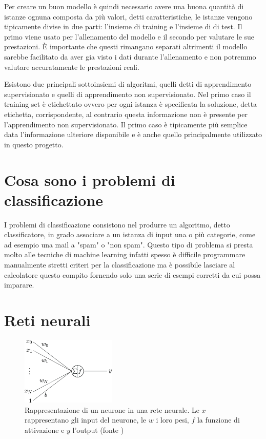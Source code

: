 \documentclass[a4paper,12pt]{report}
\begin{document}
Per creare un buon modello è quindi necessario avere una buona quantità di
istanze ognuna composta da più valori, detti caratteristiche, le istanze vengono
tipicamente divise in due parti: l'insieme di training e l'insieme di di test.
Il primo viene usato per l'allenamento del modello e il secondo per valutare le
sue prestazioni. È importante che questi rimangano separati altrimenti il
modello sarebbe facilitato da aver gia visto i dati durante l'allenamento e non
potremmo valutare accuratamente le prestazioni reali. 

Esistono due principali sottoinsiemi di algoritmi, quelli detti di apprendimento
supervisionato e quelli di apprendimento non supervisionato. Nel primo caso il
training set è etichettato ovvero per ogni istanza è specificata la soluzione,
detta etichetta, corrispondente, al contrario questa informazione non è presente
per l'apprendimento non supervisionato. Il primo caso è tipicamente più semplice
data l'informazione ulteriore disponibile e è anche quello principalmente
utilizzato in questo progetto.

\section{Cosa sono i problemi di classificazione}

I problemi di classificazione consistono nel produrre un algoritmo, detto
classificatore, in grado associare a un istanza di input una o più categorie,
come ad esempio una mail a "spam" o "non spam". Questo tipo di problema si presta
molto alle tecniche di machine learning infatti spesso è difficile programmare
manualmente stretti criteri per la classificazione ma è possibile lasciare al
calcolatore questo compito fornendo solo una serie di esempi corretti da cui
possa imparare.

\section{Reti neurali}

\begin{figure}
	\centering
	\includegraphics[width = 0.4\textwidth]{Immagini/MLP neurone.png}
	\caption{Rappresentazione di un neurone in una rete neurale. Le $x$
	rappresentano gli input del neurone, le $w$ i loro pesi, $f$ la funzione di
	attivazione e $y$ l'output (fonte \cite{immagine neurone})}
\end{figure}
\end{document}
